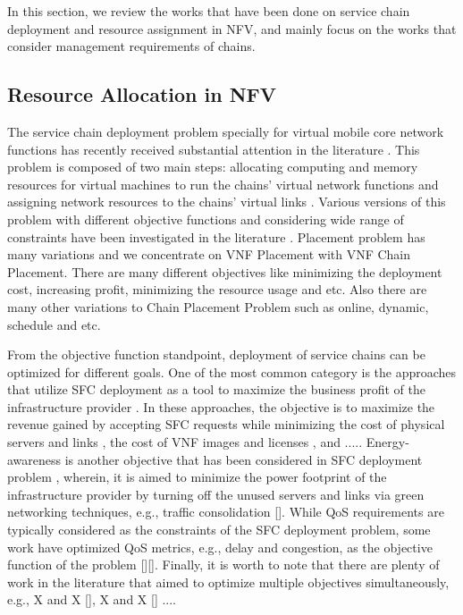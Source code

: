 In this section, we review the works that have been done on service chain deployment and resource assignment in NFV, and mainly focus on the works that consider management requirements of chains.


\subsection{Resource Allocation in NFV}
The service chain deployment problem specially for virtual mobile core network functions has recently received substantial attention in the literature \cite{GilHerrera2016}\cite{Laghrissi2019}\cite{Bhamare2016}.
This problem is composed of two main steps: allocating computing and memory resources for virtual machines to run the chains' virtual network functions and assigning network resources to the chains' virtual links \cite{Laghrissi2019}. 
Various versions of this problem with different objective functions and considering wide range of constraints have been investigated in the literature \cite{Laghrissi2019}.
Placement problem has many variations and we concentrate on VNF Placement with VNF Chain Placement. There are many different objectives
like minimizing the deployment cost, increasing profit, minimizing the resource usage and etc. \cite{Laghrissi2019}\cite{Bhamare2016}
Also there are many other variations to Chain Placement Problem such as online, dynamic, schedule and etc. \cite{1608.00095}

From the objective function standpoint, deployment of service chains can be optimized for different goals. One of the most common category is the approaches that utilize SFC deployment as a tool to maximize the business profit of the infrastructure provider \cite{Eramo2016}\cite{Eramo2017}. In these approaches, the objective is to maximize the revenue gained by accepting SFC requests while minimizing the cost of physical servers and links \cite{Eramo2016}\cite{Eramo2017}, the cost of VNF images and licenses \cite{Bouet2015}, and ..... Energy-awareness is another objective that has been considered in SFC deployment problem \cite{Eramo20173}\cite{Farkiani2019}, wherein, it is aimed to minimize the power footprint of the infrastructure provider by turning off the unused servers and links via green networking techniques, e.g., traffic consolidation  []. While QoS requirements are typically considered as the constraints of the SFC deployment problem, some work have optimized QoS metrics, e.g., delay and congestion, as the objective function of the problem  [][]. Finally, it is worth to note that there are plenty of work in the literature that aimed to optimize multiple objectives simultaneously, e.g., X and X  [], X and X  [] .... 

